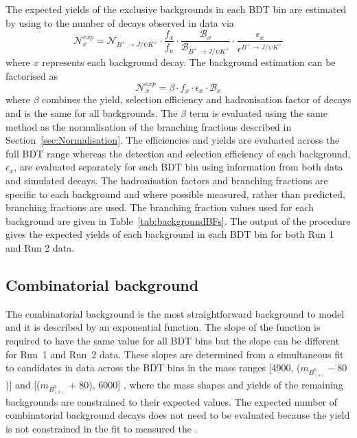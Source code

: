 {The expected yields of the exclusive backgrounds in each BDT bin are estimated by using to the number of \bujpsik decays observed in data via
\begin{equation}
\mathcal{N}^{exp}_{x} = \mathcal{N}_{B^{+} \to J/\psi K^{+}} \cdot \frac{f_{x}}{f_{u}} \cdot \frac{\mathcal{B}_{x}}{\mathcal{B}_{B^{+} \to J/\psi K^{+}}} \cdot \frac{\epsilon_{x}}{\epsilon^{B^{+} \to J/\psi K^{+}}} 
\label{eq:BkgndPredict}
\end{equation}
where $x$ represents each background decay. The background estimation can be factorised as
\begin{equation}
\mathcal{N}^{exp}_{x} = \beta \cdot f_{x} \cdot \epsilon_{x} \cdot \mathcal{B}_{x}
\label{eq:BkgndPredict2}
\end{equation}
where $\beta$ combines the yield, selection efficiency and hadronisation factor of \bujpsik decays and is the same for all backgrounds. The $\beta$ term is evaluated using the same method as the normalisation of the \bmumu branching fractions described in Section~\ref{sec:Normalisation}. The \bujpsik efficiencies and yields are evaluated across the full BDT range whereas the detection and selection efficiency of each background, $ \epsilon_{x}$, are evaluated separately for each BDT bin using information from both data and simulated decays. The hadronisation factors and branching fractions are specific to each background and where possible measured, rather than predicted, branching fractions are used. The branching fraction values used for each background are given in Table~\ref{tab:backgroundBFs}. %
The output of the procedure gives the expected yields of each background in each BDT bin for both Run 1 and Run 2 data.
\subsection{Combinatorial background}
The combinatorial background is the most straightforward background to model and it is described by an exponential function. The slope of the function is required to have the same value for all BDT bins but the slope can be different for Run~1 and Run~2 data. These slopes are determined from a simultaneous fit to candidates in data across the BDT bins in the mass ranges [4900, ($m_{B^{0}_{(s)}} - 80$)] \mevcc and [($m_{B^{0}_{(s)}}$ + 80), 6000] \mevcc, where the mass shapes and yields of the remaining backgrounds are constrained to their expected values. The expected number of combinatorial background decays does not need to be evaluated because the yield is not constrained in the fit to measured the \BFs.

}
